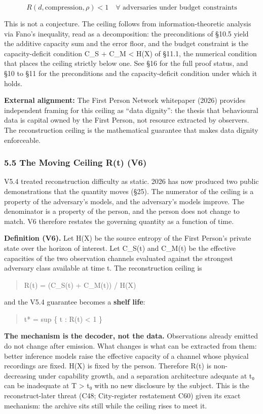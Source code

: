 \documentclass[
]{article}
\begin{document}
\[R(d, \text{compression}, \rho) < 1 \quad \forall \text{ adversaries under budget constraints}\]

This is not a conjecture. The ceiling follows from information-theoretic
analysis via Fano's inequality, read as a decomposition: the
preconditions of §10.5 yield the additive capacity sum and the error
floor, and the budget constraint is the capacity-deficit condition C\_S
+ C\_M \textless{} H(X) of §11.1, the numerical condition that places
the ceiling strictly below one. See §16 for the full proof status, and
§10 to §11 for the preconditions and the capacity-deficit condition
under which it holds.

\textbf{External alignment:} The First Person Network whitepaper (2026)
provides independent framing for this ceiling as ``data dignity'': the
thesis that behavioural data is capital owned by the First Person, not
resource extracted by observers. The reconstruction ceiling is the
mathematical guarantee that makes data dignity enforceable.

\subsubsection{5.5 The Moving Ceiling R(t)
(V6)}\label{the-moving-ceiling-rt-v6}

V5.4 treated reconstruction difficulty as static. 2026 has now produced
two public demonstrations that the quantity moves (§25). The numerator
of the ceiling is a property of the adversary's models, and the
adversary's models improve. The denominator is a property of the person,
and the person does not change to match. V6 therefore restates the
governing quantity as a function of time.

\textbf{Definition (V6).} Let H(X) be the source entropy of the First
Person's private state over the horizon of interest. Let C\_S(t) and
C\_M(t) be the effective capacities of the two observation channels
evaluated against the strongest adversary class available at time t. The
reconstruction ceiling is

\begin{quote}
R(t) = (C\_S(t) + C\_M(t)) / H(X)
\end{quote}

and the V5.4 guarantee becomes a \textbf{shelf life}:

\begin{quote}
t* = sup \{ t : R(t) \textless{} 1 \}
\end{quote}

\textbf{The mechanism is the decoder, not the data.} Observations
already emitted do not change after emission. What changes is what can
be extracted from them: better inference models raise the effective
capacity of a channel whose physical recordings are fixed. H(X) is fixed
by the person. Therefore R(t) is non-decreasing under capability growth,
and a separation architecture adequate at t₀ can be inadequate at T
\textgreater{} t₀ with no new disclosure by the subject. This is the
reconstruct-later threat (C48; City-register restatement C60) given its
exact mechanism: the archive sits still while the ceiling rises to meet
it.
\end{document}
